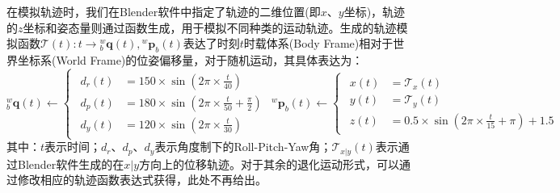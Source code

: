 在模拟轨迹时，我们在Blender软件中指定了轨迹的二维位置(即$x$、$y$坐标)，轨迹的$z$坐标和姿态量则通过函数生成，用于模拟不同种类的运动轨迹。生成的轨迹模拟函数$\mathcal{T}(t):t\to {^{w}_{b}\boldsymbol{q}(t)},{^{w}\boldsymbol{p}_{b}(t)} $表达了时刻$t$时载体系(Body Frame)相对于世界坐标系(World Frame)的位姿偏移量，对于随机运动，其具体表达为：
\begin{equation}
  {^{w}_{b}\boldsymbol{q}}(t)\gets\begin{cases}
    \begin{aligned}
      d_{r}(t) & =150\times\sin(2\pi\times\frac{t}{40})               \\
      d_{p}(t) & =180\times\sin(2\pi\times\frac{t}{50}+\frac{\pi}{2}) \\
      d_{y}(t) & =120\times\sin(2\pi\times\frac{t}{30})
    \end{aligned}
  \end{cases}
  {^{w}\boldsymbol{p}_{b}}(t)\gets\begin{cases}
    \begin{aligned}
      x(t) & =\mathcal{T}_x(t)                              \\
      y(t) & =\mathcal{T}_y(t)                              \\
      z(t) & =0.5\times\sin(2\pi\times\frac{t}{15}+\pi)+1.5
    \end{aligned}
  \end{cases}
\end{equation}
其中：$t$表示时间；$d_{r}$、$d_{p}$、$d_{y}$表示角度制下的Roll-Pitch-Yaw角；$\mathcal{T}_{x|y}(t)$表示通过Blender软件生成的在$x|y$方向上的位移轨迹。对于其余的退化运动形式，可以通过修改相应的轨迹函数表达式获得，此处不再给出。
